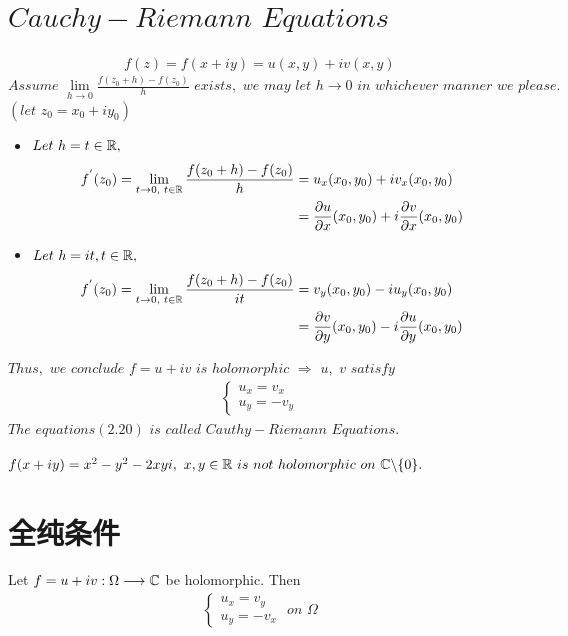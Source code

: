 \section{$Cauchy - Riemann \,\, Equations$}
	\begin{align}
		f(z) = f(x + iy) = u(x , y) + iv(x , y)
	\end{align}
	$Assume \,\, \underset{h \to 0}{\lim}{\frac{f(z_0 + h) - f(z_0)}{h}} \,\, exists , \,\, we \,\, may \,\, let \,\, h \to 0 \,\, in \,\, whichever \,\, manner \,\, we \,\, please. $\\
	$(let \,\, z_0 = x_0 + iy_0)$
	\begin{itemize}
		\item $Let \,\, h = t \in \mathbb{R} , $
		\begin{align}
			f^{'}(z_0) = \lim_{t \to 0 , \,\, t \in \mathbb{R}}{\frac{f(z_0 + h) - f(z_0)}{h}} &= u_x (x_0 , y_0) + i v_x (x_0 , y_0) \\
			&= \frac{\partial u}{\partial x}(x_0 , y_0) + i\frac{\partial v}{\partial x}(x_0 , y_0)
		\end{align}
	
		\item $Let \,\, h = it , t \in \mathbb{R} ,$
		\begin{align}
			f^{'}(z_0) = \lim_{t \to 0 , \,\, t \in \mathbb{R}}{\frac{f(z_0 + h) - f(z_0)}{it}} &= v_y(x_0 , y_0) - iu_y(x_0 , y_0) \\
			&= \frac{\partial v}{\partial y}(x_0 , y_0) - i\frac{\partial u}{\partial y}(x_0 , y_0)
		\end{align}
	\end{itemize}
	$Thus , \,\, we \,\, conclude \,\, f = u + iv \,\, is \,\, holomorphic \,\, \Rightarrow \,\, u , \,\, v \,\, satisfy$
	\begin{align}
		\begin{cases}
			u_x = v_x\\
			u_y = - v_y
		\end{cases}
	\end{align}
	$The \,\, equations(2.20) \,\, is \,\, called \,\, \underline{\textbf{$Cauthy - Riemann \,\, Equations$}}$.
	
	\vspace*{2em}
	\begin{example}\label{ex 2.3.1}
		$f(x + iy) = x^2 - y^2 - 2xyi , \,\, x , y \in \mathbb{R} \,\, is \,\, not \,\, holomorphic \,\, on \,\, \mathbb{C} \backslash \{ 0 \}.$
	\end{example}

\newpage
\section{全纯条件}
	Let $f = u + i v : \Omega \longrightarrow \mathbb{C}$ be holomorphic. Then
	\begin{align}
		\begin{cases}
			u_x = v_y \\
			u_y = - v_x
		\end{cases} \,\, on \,\, \Omega
	\end{align}

